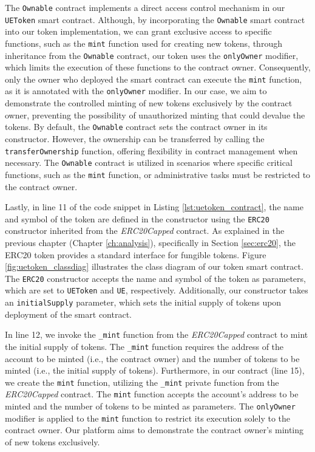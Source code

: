 


The \texttt{Ownable} contract implements a direct access control mechanism in our \texttt{UEToken} smart contract. Although, by incorporating the
 \texttt{Ownable} smart contract into our token implementation, we can grant exclusive access to specific functions, such as the \texttt{mint} 
 function used for creating new tokens, through inheritance from the \texttt{Ownable} contract, our token uses the \texttt{onlyOwner} modifier, 
 which limits the execution of these functions to the contract owner. Consequently, only the owner who deployed the smart contract can execute 
 the \texttt{mint} function, as it is annotated with the \texttt{onlyOwner} modifier. In our case, we aim to demonstrate the controlled minting 
 of new tokens exclusively by the contract owner, preventing the possibility of unauthorized minting that could devalue the tokens.
By default, the \texttt{Ownable} contract sets the contract owner in its constructor. However, the ownership can be transferred by calling the 
\texttt{transferOwnership} function, offering flexibility in contract management when necessary. The \texttt{Ownable} contract is utilized in 
scenarios where specific critical functions, such as the \texttt{mint} function, or administrative tasks must be restricted to the contract 
owner.



Lastly, in line 11 of the code snippet in Listing \ref{lst:uetoken_contract}, the name and symbol of the token are defined in the constructor using the \texttt{ERC20} constructor inherited from the \textit{ERC20Capped} contract. As explained in the previous chapter (Chapter \ref{ch:analysis}), specifically in Section \ref{sec:erc20}, the ERC20 token provides a standard interface for fungible tokens. Figure \ref{fig:uetoken_classdiag} illustrates the class diagram of our token smart contract. The \texttt{ERC20} constructor accepts the name and symbol of the token as parameters, which are set to \texttt{UEToken} and \texttt{UE}, respectively. Additionally, our constructor takes an \texttt{initialSupply} parameter, which sets the initial supply of tokens upon deployment of the smart contract.

In line 12, we invoke the \texttt{\_mint} function from the \textit{ERC20Capped} contract to mint the initial supply of tokens. The \texttt{\_mint} function requires the address of the account to be minted (i.e., the contract owner) and the number of tokens to be minted (i.e., the initial supply of tokens). Furthermore, in our contract (line 15), we create the \texttt{mint} function, utilizing the \texttt{\_mint} private function from the \textit{ERC20Capped} contract. The \texttt{mint} function accepts the account's address to be minted and the number of tokens to be minted as parameters. The \texttt{onlyOwner} modifier is applied to the \texttt{mint} function to restrict its execution solely to the contract owner. Our platform aims to demonstrate the contract owner's minting of new tokens exclusively.

